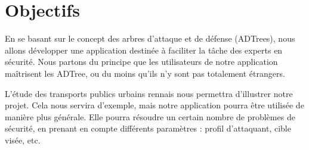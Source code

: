 \section{Objectifs}
	\label{sec:objectifs}

	En se basant sur le concept des arbres d’attaque et de défense (ADTrees), nous allons développer une application destinée à faciliter la tâche des experts en sécurité. Nous partons du principe que les utilisateurs de notre application maîtrisent les ADTree, ou du moins qu’ils n’y sont pas totalement étrangers.

	L’étude des transports publics urbains rennais nous permettra d’illustrer notre projet. Cela nous servira d’exemple, mais notre application pourra être utilisée de manière plus générale. Elle pourra résoudre un certain nombre de problèmes de sécurité, en prenant en compte différents paramètres : profil d’attaquant, cible visée, etc. %